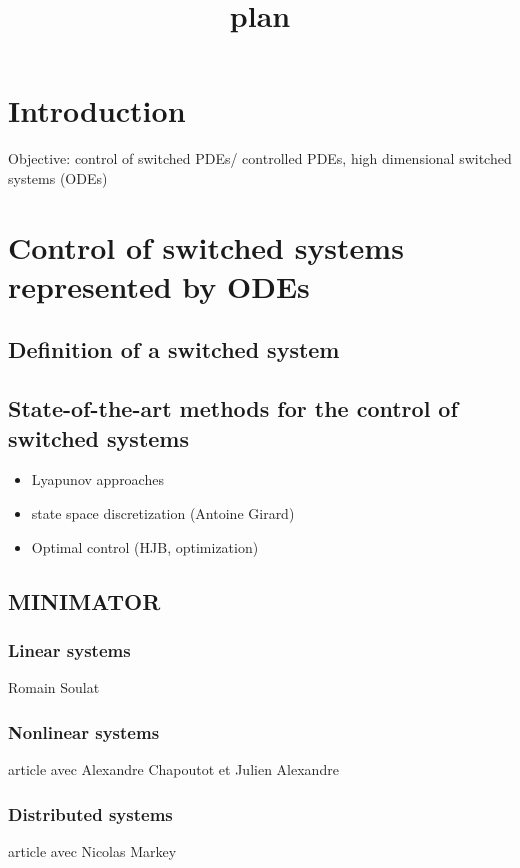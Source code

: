 \documentclass[a4paper,10pt]{article}
\title{plan}
\author{}
\begin{document}
\maketitle

\section{Introduction}

Objective: control of switched PDEs/ controlled PDEs, high dimensional switched systems (ODEs) 



\section{Control of switched systems represented by ODEs}
\subsection{Definition of a switched system}
\subsection{State-of-the-art methods for the control of switched systems}

  \begin{itemize}
    \item Lyapunov approaches 
    \item state space discretization (Antoine Girard)
   \item Optimal control (HJB, optimization)
  \end{itemize}

  


\subsection{MINIMATOR}  
\subsubsection{Linear systems}
Romain Soulat

\subsubsection{Nonlinear systems}

article avec Alexandre Chapoutot et Julien Alexandre


\subsubsection{Distributed systems}
article avec Nicolas Markey
\end{document}
